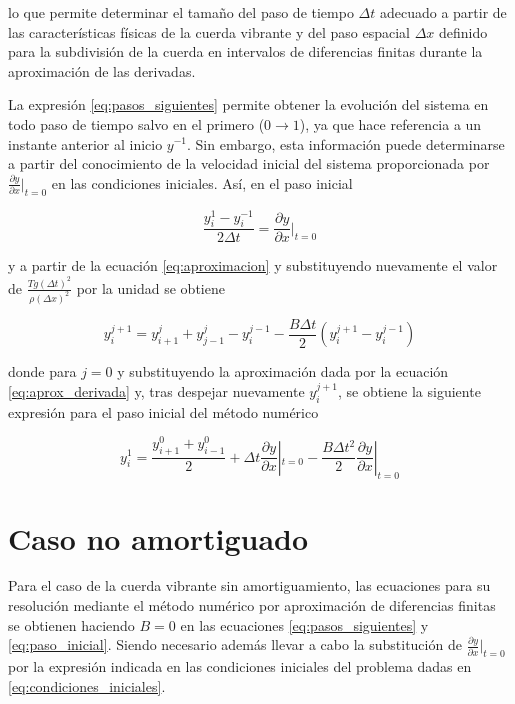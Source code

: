 \documentclass[11pt]{article}
\begin{document}
lo que permite determinar el tamaño del paso de tiempo $\Delta{t}$ adecuado a partir de las
características físicas de la cuerda vibrante y del paso espacial $\Delta{x}$ definido para
la subdivisión de la cuerda en intervalos de diferencias finitas durante la aproximación de
las derivadas.

La expresión \eqref{eq:pasos_siguientes} permite obtener la evolución del sistema
en todo paso de tiempo salvo en el primero ($0 \rightarrow 1$), ya que hace referencia a
un instante anterior al inicio $y^{-1}$. Sin embargo, esta información puede determinarse a
partir del conocimiento de la velocidad inicial del sistema proporcionada por
$\frac{\partial{y}}{\partial{x}}|_{t=0}$ en las condiciones iniciales.
Así, en el paso inicial

\begin{equation}
\frac{y^1_i - y^{-1}_i}{2\Delta{t}} = \frac{\partial{y}}{\partial{x}}|_{t=0}
\label{eq:aprox_derivada}
\end{equation}

y a partir de la ecuación \eqref{eq:aproximacion} y substituyendo nuevamente el valor de 
$\frac{Tg(\Delta{t})^2}{\rho(\Delta{x})^2}$ por la unidad se obtiene

\begin{equation}
y^{j+1}_i = y^{j}_{i+1} + y^{j}_{j-1} - y^{j-1}_i - \frac{B\Delta{t}}{2}(y^{j+1}_i - y^{j-1}_i)
\end{equation}

donde para $j=0$ y substituyendo la aproximación dada por la ecuación
\eqref{eq:aprox_derivada} y, tras despejar nuevamente $y^{j+1}_i$, se obtiene la siguiente
expresión para el paso inicial del método numérico

\begin{equation}
y^1_i = \frac{y^0_{i+1} + y^0_{i-1}}{2} + \Delta{t}\frac{\partial{y}}{\partial{x}}|_{t=0}
	- \frac{B\Delta{t}^2}{2}\frac{\partial{y}}{\partial{x}}|_{t=0}
\label{eq:paso_inicial}
\end{equation}

\section{Caso no amortiguado}
Para el caso de la cuerda vibrante sin amortiguamiento, las ecuaciones para su resolución
mediante el método numérico por aproximación de diferencias finitas se obtienen haciendo
$B=0$ en las ecuaciones \eqref{eq:pasos_siguientes} y \eqref{eq:paso_inicial}. Siendo
necesario además llevar a cabo la substitución de $\frac{\partial{y}}{\partial{x}}|_{t=0}$
por la expresión indicada en las condiciones iniciales del problema dadas en
\eqref{eq:condiciones_iniciales}.
\end{document}
